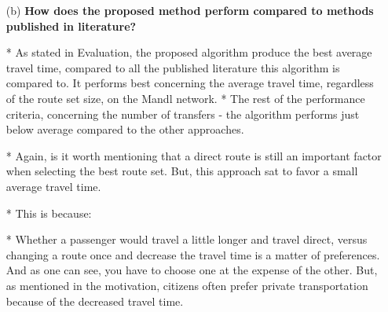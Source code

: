 \begin{enumerate}[label=\textbf{\arabic*})]
\begin{enumerate}
    \item[(b)]  \textbf{How does the proposed method perform compared to methods published in literature?}

    * As stated in Evaluation, the proposed algorithm produce the best average travel time, compared to all the published literature this algorithm is compared to. It performs best concerning the average travel time, regardless of the route set size, on the Mandl network. 
    * The rest of the performance criteria, concerning the number of transfers - the algorithm performs just below average compared to the other approaches. 

    * Again, is it worth mentioning that a direct route is still an important factor when selecting the best route set. But, this approach sat to favor a small average travel time.

    * This is because:

    * Whether a passenger would travel a little longer and travel direct, versus changing a route once and decrease the travel time is a matter of preferences. And as one can see, you have to choose one at the expense of the other. But, as mentioned in the motivation, citizens often prefer private transportation because of the decreased travel time. 

    \end{enumerate}
\end{enumerate}